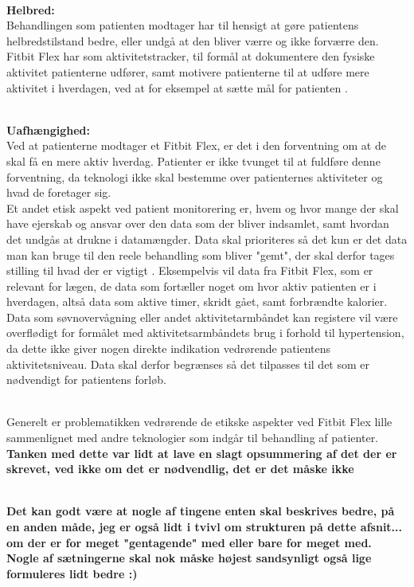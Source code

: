 \noindent \\
\textbf{Helbred:}
\noindent \\
Behandlingen som patienten modtager har til hensigt at gøre patientens helbredstilstand bedre, eller undgå at den bliver værre og ikke forværre den. Fitbit Flex har som aktivitetstracker, til formål at dokumentere den fysiske aktivitet patienterne udfører, samt motivere patienterne til at udføre mere aktivitet i hverdagen, ved at for eksempel at sætte mål for patienten \citep{Nordgren2013}. 

\noindent \\
\textbf{Uafhængighed:}
\noindent \\
Ved at patienterne modtager et Fitbit Flex, er det i den forventning om at de skal få en mere aktiv hverdag. Patienter er ikke tvunget til at fuldføre denne forventning, da teknologi ikke skal bestemme over patienternes aktiviteter og hvad de foretager sig. \citep{Nordgren2013}
\\

Et andet etisk aspekt ved patient monitorering er, hvem og hvor mange der skal have ejerskab og ansvar over den data som der bliver indsamlet, samt hvordan det undgås at drukne i datamængder. Data skal prioriteres så det kun er det data man kan bruge til den reele behandling som bliver "gemt", der skal derfor tages stilling til hvad der er vigtigt \citep{patienthome2015}. Eksempelvis vil data fra Fitbit Flex, som er relevant for lægen, de data som fortæller noget om hvor aktiv patienten er i hverdagen, altså data som aktive timer, skridt gået, samt forbrændte kalorier. Data som søvnovervågning eller andet aktivitetarmbåndet kan registere vil være overflødigt for formålet med aktivitetsarmbåndets brug i forhold til hypertension, da dette ikke giver nogen direkte indikation vedrørende patientens aktivitetsniveau. Data skal derfor begrænses så det tilpasses til det som er nødvendigt for patientens forløb. 

\\
Generelt er problematikken vedrørende de etikske aspekter ved Fitbit Flex lille sammenlignet med andre teknologier som indgår til behandling af patienter. \textbf{Tanken med dette var lidt at lave en slagt opsummering af det der er skrevet, ved ikke om det er nødvendlig, det er det måske ikke}

\\
\textbf{Det kan godt være at nogle af tingene enten skal beskrives bedre, på en anden måde, jeg er også lidt i tvivl om strukturen på dette afsnit... om der er for meget "gentagende" med eller bare for meget med. Nogle af sætningerne skal nok måske højest sandsynligt også lige formuleres lidt bedre :) }











